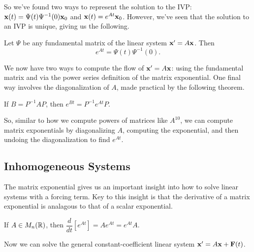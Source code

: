 \documentclass[../m082main.tex]{subfiles}
\begin{document}
So we've found two ways to represent the solution to the IVP: $\mathbf{x}(t) = \Psi(t) \Psi^{-1}(0)\mathbf{x}_0$ and $\mathbf{x}(t) = e^{At} \mathbf{x}_0$.
However, we've seen that the solution to an IVP is unique, giving us the following.

\begin{theorem}[Characterization of $e^{At}$]
    Let $\Psi$ be any fundamental matrix of the linear system $\mathbf{x}' = A\mathbf{x}$.
    Then
    \[ e^{At} = \Psi (t) \Psi^{-1} (0). \]
\end{theorem}

We now have two ways to compute the flow of $\mathbf{x}' = A \mathbf{x}$: using the fundamental matrix and via the power series definition of the matrix exponential.
One final way involves the diagonalization of $A$, made practical by the following theorem.

\begin{theorem}
    If $B = P^{-1} A P$, then $e^{Bt} = P^{-1} e^{At} P$.
\end{theorem}

So, similar to how we compute powers of matrices like $A^{10}$, we can compute matrix exponentials by diagonalizing $A$, computing the exponential, and then undoing the diagonalization to find $e^{At}$.

\subsection{Inhomogeneous Systems}
The matrix exponential gives us an important insight into how to solve linear systems with a forcing term.
Key to this insight is that the derivative of a matrix exponential is analagous to that of a scalar exponential.

\begin{lemma}
    If $A \in M_n (\mathbb{R})$, then $\dfrac{d}{dt} \left[ e^{At} \right] = A e^{At} = e^{At} A$.
\end{lemma}

Now we can solve the general constant-coefficient linear system $\mathbf{x}' = A \mathbf{x} + \mathbf{F}(t)$.
\end{document}
